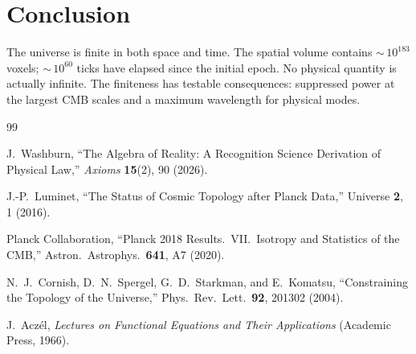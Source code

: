 \documentclass[12pt,a4paper]{article}
\theoremstyle{definition}
\theoremstyle{remark}
\begin{document}
\section{Conclusion}
\label{sec:conclusion}

The universe is finite in both space and time.  The spatial volume
contains ${\sim}\,10^{183}$ voxels; ${\sim}\,10^{60}$ ticks have
elapsed since the initial epoch.  No physical quantity is actually
infinite.  The finiteness has testable consequences: suppressed power
at the largest CMB scales and a maximum wavelength for physical modes.

\begin{thebibliography}{99}

J.~Washburn, ``The Algebra of Reality: A Recognition Science Derivation
of Physical Law,'' \emph{Axioms} \textbf{15}(2), 90 (2026).

J.-P.~Luminet, ``The Status of Cosmic Topology after Planck Data,''
Universe \textbf{2}, 1 (2016).

Planck Collaboration, ``Planck 2018 Results.\ VII.\ Isotropy and
Statistics of the CMB,'' Astron.\ Astrophys.\ \textbf{641}, A7
(2020).

N.~J.~Cornish, D.~N.~Spergel, G.~D.~Starkman, and E.~Komatsu,
``Constraining the Topology of the Universe,'' Phys.\ Rev.\ Lett.\
\textbf{92}, 201302 (2004).

J.~Acz\'el, \emph{Lectures on Functional Equations and Their
Applications} (Academic Press, 1966).

\end{thebibliography}
\end{document}

